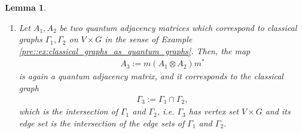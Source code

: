 \documentclass{amsart}
\newtheorem{lemma}[thm]{Lemma}
\theoremstyle{definition}
\theoremstyle{definition}
\begin{document}
\begin{lemma}
\begin{enumerate}
        \item Let $A_1, A_2$ be two quantum adjacency matrices which correspond to classical graphs $\Gamma_1, \Gamma_2$ on $V \times G$ in the sense of Example \ref{pre::ex:classical_graphs_as_quantum_graphs}. Then, the map
        \begin{align*}
            A_3 := m(A_1 \otimes A_2) m^\ast
        \end{align*}
        is again a quantum adjacency matrix, and it corresponds to the classical graph
        \begin{align*}
            \Gamma_3 := \Gamma_1 \cap \Gamma_2,
        \end{align*}
        which is the intersection of $\Gamma_1$ and $\Gamma_2$, i.e. $\Gamma_3$ has vertex set $V \times G$ and its edge set is the intersection of the edge sets of $\Gamma_1$ and $\Gamma_2$.
    \end{enumerate}
\end{lemma}
\end{document}
